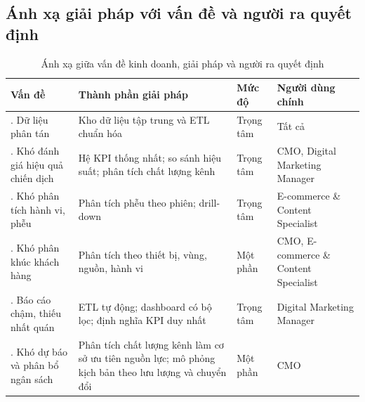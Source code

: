 \subsection{Ánh xạ giải pháp với vấn đề và người ra quyết định}

\begin{table}[H]
    \centering
    \renewcommand{\arraystretch}{1.3}
    \caption{Ánh xạ giữa vấn đề kinh doanh, giải pháp và người ra quyết định}
    \label{tab:solution_mapping}
    \begin{tabularx}{\textwidth}{
        >{\raggedright\arraybackslash}p{2.5cm}
        >{\raggedright\arraybackslash}X
        >{\centering\arraybackslash}p{1.8cm}
        >{\raggedright\arraybackslash}p{3cm}
    }
        \hline
        \textbf{Vấn đề} &
        \textbf{Thành phần giải pháp} &
        \textbf{Mức độ} &
        \textbf{Người dùng chính} \\
        \hline

        1. Dữ liệu phân tán &
        Kho dữ liệu tập trung và ETL chuẩn hóa &
        Trọng tâm &
        Tất cả \\

        2. Khó đánh giá hiệu quả chiến dịch &
        Hệ KPI thống nhất; so sánh hiệu suất; phân tích chất lượng kênh &
        Trọng tâm &
        CMO, Digital Marketing Manager \\

        3. Khó phân tích hành vi, phễu &
        Phân tích phễu theo phiên; drill-down &
        Trọng tâm &
        E-commerce \& Content Specialist \\

        4. Khó phân khúc khách hàng &
        Phân tích theo thiết bị, vùng, nguồn, hành vi &
        Một phần &
        CMO, E-commerce \& Content Specialist \\

        5. Báo cáo chậm, thiếu nhất quán &
        ETL tự động; dashboard có bộ lọc; định nghĩa KPI duy nhất &
        Trọng tâm &
        Digital Marketing Manager \\

        6. Khó dự báo và phân bổ ngân sách &
        Phân tích chất lượng kênh làm cơ sở ưu tiên nguồn lực; mô phỏng kịch bản theo lưu lượng và chuyển đổi &
        Một phần &
        CMO \\

        \hline
    \end{tabularx}
\end{table}



